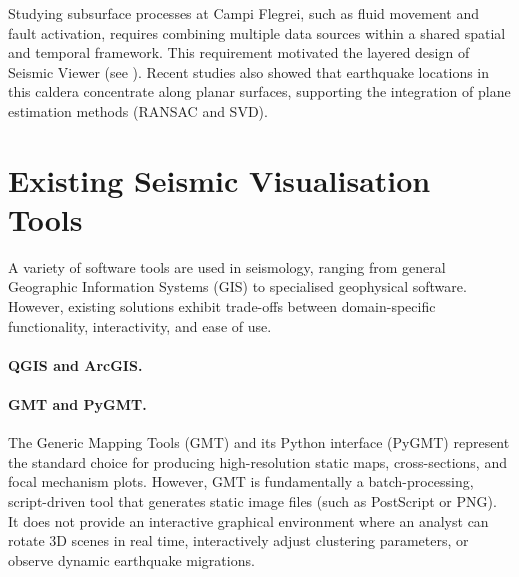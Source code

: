 Studying subsurface processes at Campi Flegrei, such as fluid movement and fault activation, requires combining multiple data sources within a shared spatial and temporal framework. This requirement motivated the layered design of Seismic Viewer (see ). Recent studies \cite{giordano2025birth} also showed that earthquake locations in this caldera concentrate along planar surfaces, supporting the integration of plane estimation methods (RANSAC and SVD).


\section{Existing Seismic Visualisation Tools}
\label{sec:related-tools}
\label{sec:existing-tools}

A variety of software tools are used in seismology, ranging from general Geographic Information Systems (GIS) to specialised geophysical software. However, existing solutions exhibit trade-offs between domain-specific functionality, interactivity, and ease of use.

\paragraph{QGIS and ArcGIS.}

\paragraph{GMT and PyGMT.}
The Generic Mapping Tools (GMT) and its Python interface (PyGMT) represent the standard choice for producing high-resolution static maps, cross-sections, and focal mechanism plots. However, GMT is fundamentally a batch-processing, script-driven tool that generates static image files (such as PostScript or PNG). It does not provide an interactive graphical environment where an analyst can rotate 3D scenes in real time, interactively adjust clustering parameters, or observe dynamic earthquake migrations.

